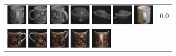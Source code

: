 \begin{figure}[!bp]
\begin{tabular}{m{11cm} | m{3cm} |}
\includegraphics[width=1cm]{coil/beeld-53.eps}
\includegraphics[width=1cm]{coil/beeld-49.eps}
\includegraphics[width=1cm]{coil/beeld-52.eps}
\includegraphics[width=1cm]{coil/beeld-26.eps}
\includegraphics[width=1cm]{coil/beeld-28.eps}
\includegraphics[width=1cm]{coil/beeld-27.eps}
\includegraphics[width=1cm]{coil/beeld-41.eps}
& {\scriptsize 0.0}
\\
\includegraphics[width=1cm]{coil/beeld-60.eps}
\includegraphics[width=1cm]{coil/beeld-61.eps}
\includegraphics[width=1cm]{coil/beeld-63.eps}
\includegraphics[width=1cm]{coil/beeld-62.eps}
\includegraphics[width=1cm]{coil/beeld-65.eps}

\end{tabular}
\end{figure}
